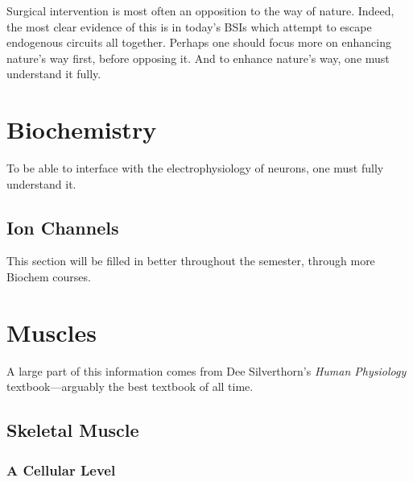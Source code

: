 \documentclass[12pt]{report}
\begin{document}
Surgical intervention is most often an opposition to the way of nature. Indeed, the most clear evidence of this is in today's BSIs which attempt to escape endogenous circuits all together. Perhaps one should focus more on enhancing nature's way first, before opposing it. And to enhance nature's way, one must understand it fully. 

\chapter{Biochemistry}

To be able to interface with the electrophysiology of neurons, one must fully understand it. 

\section{Ion Channels}


This section will be filled in better throughout the semester, through more Biochem courses. 


\chapter{Muscles}

A large part of this information comes from Dee Silverthorn's \textit{Human Physiology} textbook---arguably the best textbook of all time. 

\section{Skeletal Muscle}
\subsection{A Cellular Level}
\end{document}
